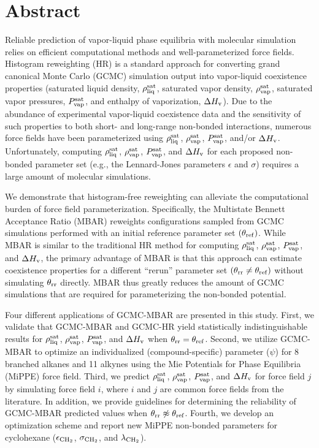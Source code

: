 \documentclass[12pt]{article}
\begin{document}
\section*{Abstract}

Reliable prediction of vapor-liquid phase equilibria with molecular simulation relies on efficient computational methods and well-parameterized force fields. Histogram reweighting (HR) is a standard approach for converting grand canonical Monte Carlo (GCMC) simulation output into vapor-liquid coexistence properties (saturated liquid density, $\rho_{\rm liq}^{\rm sat}$, saturated vapor density, $\rho_{\rm vap}^{\rm sat}$, saturated vapor pressures, $P_{\rm vap}^{\rm sat}$, and enthalpy of vaporization, $\Delta H_{\rm v}$). Due to the abundance of experimental vapor-liquid coexistence data and the sensitivity of such properties to both short- and long-range non-bonded interactions, numerous force fields have been parameterized using $\rho_{\rm liq}^{\rm sat}$, $\rho_{\rm vap}^{\rm sat}$, $P_{\rm vap}^{\rm sat}$, and/or $\Delta H_{\rm v}$. Unfortunately, computing $\rho_{\rm liq}^{\rm sat}$, $\rho_{\rm vap}^{\rm sat}$, $P_{\rm vap}^{\rm sat}$, and $\Delta H_{\rm v}$ for each proposed non-bonded parameter set (e.g., the Lennard-Jones parameters $\epsilon$ and $\sigma$) requires a large amount of molecular simulations. 

We demonstrate that histogram-free reweighting can alleviate the computational burden of force field parameterization. Specifically, the Multistate Bennett Acceptance Ratio (MBAR) reweights configurations sampled from GCMC simulations performed with an initial reference parameter set $(\theta_{\rm ref})$. While MBAR is similar to the traditional HR method for computing $\rho_{\rm liq}^{\rm sat}$, $\rho_{\rm vap}^{\rm sat}$, $P_{\rm vap}^{\rm sat}$, and $\Delta H_{\rm v}$, the primary advantage of MBAR is that this approach can estimate coexistence properties for a different ``rerun'' parameter set $(\theta_{\rm rr} \neq \theta_{\rm ref})$ without simulating $\theta_{\rm rr}$ directly. MBAR thus greatly reduces the amount of GCMC simulations that are required for parameterizing the non-bonded potential.

Four different applications of GCMC-MBAR are presented in this study. First, we validate that GCMC-MBAR and GCMC-HR yield statistically indistinguishable results for $\rho_{\rm liq}^{\rm sat}$, $\rho_{\rm vap}^{\rm sat}$, $P_{\rm vap}^{\rm sat}$, and $\Delta H_{\rm v}$ when $\theta_{\rm rr} = \theta_{\rm ref}$. Second, we utilize GCMC-MBAR to optimize an individualized (compound-specific) parameter ($\psi$) for 8 branched alkanes and 11 alkynes using the Mie Potentials for Phase Equilibria (MiPPE) force field. Third, we predict $\rho_{\rm liq}^{\rm sat}$, $\rho_{\rm vap}^{\rm sat}$, $P_{\rm vap}^{\rm sat}$, and $\Delta H_{\rm v}$ for force field $j$ by simulating force field $i$, where $i$ and $j$ are common force fields from the literature. In addition, we provide guidelines for determining the reliability of GCMC-MBAR predicted values when $\theta_{\rm rr} \not\approx \theta_{\rm ref}$. Fourth, we develop an optimization scheme and report new MiPPE non-bonded parameters for cyclohexane ($\epsilon_{\rm CH_2}$, $\sigma_{\rm CH_2}$, and $\lambda_{\rm CH_2}$).   
\end{document}
